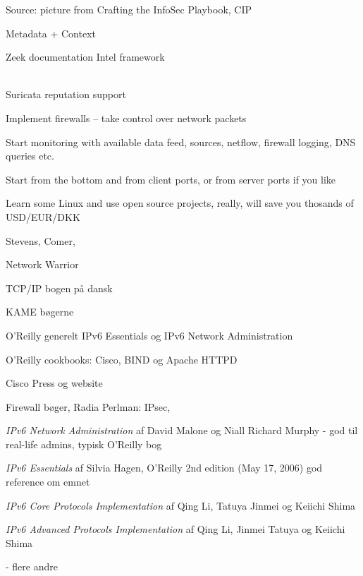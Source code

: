 \documentclass[Screen16to9,17pt]{foils}
\begin{document}


Source: picture from Crafting the InfoSec Playbook, CIP

Metadata + Context



\begin{list1}
\item Zeek documentation Intel framework\\
\\
\item Suricata reputation support\\
\end{list1}




\begin{list2}
\item Implement firewalls -- take control over network packets
\item Start monitoring with available data feed, sources, netflow, firewall logging, DNS queries etc.
\item Start from the bottom and from client ports, or from server ports if you like
\item Learn some Linux and use open source projects, really, will save you thosands of USD/EUR/DKK
\end{list2}


\begin{list2}
\item Stevens, Comer,
\item Network Warrior
\item TCP/IP bogen på dansk
\item KAME bøgerne
\item O'Reilly generelt IPv6 Essentials og IPv6 Network Administration
\item O'Reilly cookbooks: Cisco, BIND og Apache HTTPD
\item Cisco Press og website
\item Firewall bøger, Radia Perlman: IPsec,
\end{list2}


\begin{list1}
\item \emph{IPv6 Network Administration}
af David Malone og Niall Richard Murphy
 - god til real-life admins, typisk
O'Reilly bog
\item \emph{IPv6 Essentials} af Silvia Hagen, O'Reilly 2nd edition (May 17, 2006)
	god reference om emnet
\item \emph{IPv6 Core Protocols Implementation}
af Qing Li, Tatuya Jinmei og Keiichi Shima
\item \emph{IPv6 Advanced Protocols Implementation}
af Qing Li, Jinmei Tatuya og Keiichi Shima
\item - flere andre
\end{list1}
\end{document}
